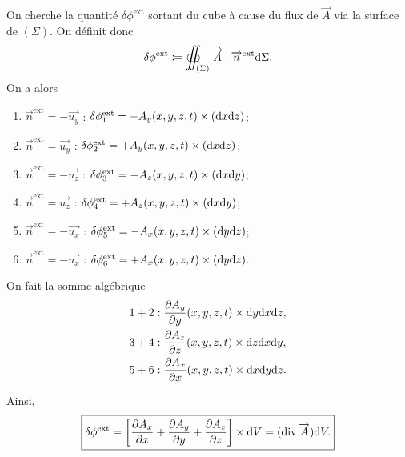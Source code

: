         On cherche la quantité $\delta \phi^{\text{ext}}$ sortant du cube à cause du flux de $\vec{A}$ via la surface de $(\Sigma)$.
        On définit donc 
        \begin{equation*}
            \delta \phi^{\text{ext}}\coloneqq\oiint_{(\Sigma)}\protect\overrightarrow{{A}}\cdot\protect\overrightarrow{{n}}^{\text{ext}}\mathrm{d}\Sigma.
        \end{equation*}
        On a alors
        \begin{enumerate}[label=(\arabic*)]
            \item $\vec{n}^{\text{ext}}=-\vec{u_y}$ : $\delta \phi_{1}^{\text{ext}}=-A_y(x,y,z,t)\times(\mathrm{d} x\mathrm{d} z)$;
            \item $\vec{n}^{\text{ext}}=\vec{u_y}$ : $\delta \phi_{2}^{\text{ext}}=+A_y(x,y,z,t)\times(\mathrm{d} x\mathrm{d} z)$;
            \item $\vec{n}^{\text{ext}}=-\vec{u_z}$ : $\delta \phi_{3}^{\text{ext}}=-A_z(x,y,z,t)\times(\mathrm{d} x\mathrm{d} y)$;
            \item $\vec{n}^{\text{ext}}=\vec{u_z}$ : $\delta \phi_{4}^{\text{ext}}=+A_z(x,y,z,t)\times(\mathrm{d} x\mathrm{d} y)$;
            \item $\vec{n}^{\text{ext}}=-\vec{u_x}$ : $\delta \phi_{5}^{\text{ext}}=-A_x(x,y,z,t)\times(\mathrm{d} y\mathrm{d} z)$;
            \item $\vec{n}^{\text{ext}}=-\vec{u_x}$ : $\delta \phi_{6}^{\text{ext}}=+A_x(x,y,z,t)\times(\mathrm{d} y\mathrm{d} z)$.
        \end{enumerate}

        On fait la somme algébrique
        \begin{equation*}
            \begin{aligned}
                1+2 &: \frac{\partial A_y}{\partial y}(x,y,z,t)\times\mathrm{d} y\mathrm{d} x\mathrm{d} z,\\
                3+4 &: \frac{\partial A_z}{\partial z}(x,y,z,t)\times\mathrm{d} z\mathrm{d} x\mathrm{d} y,\\
                5+6 &: \frac{\partial A_x}{\partial x}(x,y,z,t)\times\mathrm{d} x\mathrm{d} y\mathrm{d} z.
            \end{aligned}
        \end{equation*}

        Ainsi,
        \begin{equation*}
            \boxed{
                \delta \phi^{\text{ext}}=\left[
                    \frac{\partial A_x}{\partial x}+\frac{\partial A_y}{\partial y}+\frac{\partial A_z}{\partial z}
                \right]\times \mathrm{d} V=(\operatorname{div}\protect\overrightarrow{{A}})\mathrm{d} V.
            }
        \end{equation*}

